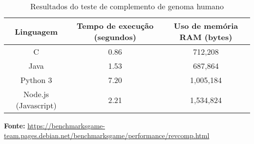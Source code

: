 \begin{table}[ht]
    \centering
    \caption{Resultados do teste de complemento de genoma humano}
    \begin{tabular}{| c | c | c |}
        \hline 
        Linguagem & Tempo de execução (segundos)
        & Uso de memória RAM (bytes) \\
        \hline
        C & 0.86 & 712,208 \\
        \hline 
        Java & 1.53 & 687,864 \\
        \hline
        Python 3 & 7.20 & 1,005,184 \\
        \hline
        Node.js (Javascript) & 2.21 & 1,534,824 \\ 
        \hline
        
    \end{tabular}
    \textbf{Fonte:} \url{https://benchmarksgame-team.pages.debian.net/benchmarksgame/performance/revcomp.html}
\end{table}


\newpage
